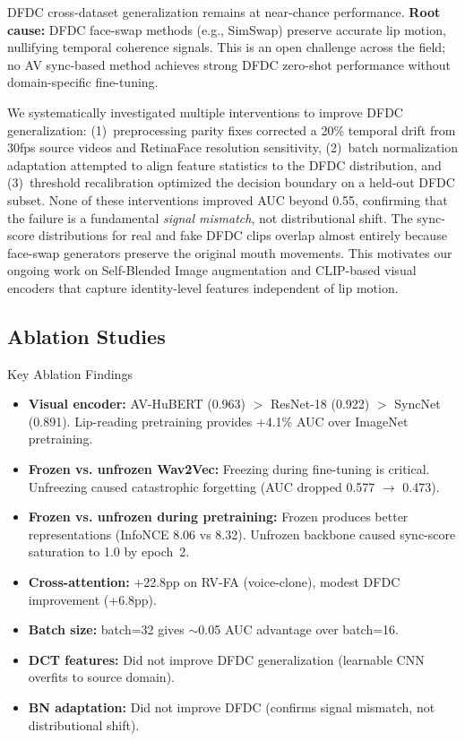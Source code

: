 \documentclass[12pt, letterpaper]{article}
\begin{document}
DFDC cross-dataset generalization remains at near-chance performance. \textbf{Root cause:} DFDC face-swap methods (e.g., SimSwap) preserve accurate lip motion, nullifying temporal coherence signals. This is an open challenge across the field; no AV sync-based method achieves strong DFDC zero-shot performance without domain-specific fine-tuning.

We systematically investigated multiple interventions to improve DFDC generalization: (1)~preprocessing parity fixes corrected a 20\% temporal drift from 30fps source videos and RetinaFace resolution sensitivity, (2)~batch normalization adaptation attempted to align feature statistics to the DFDC distribution, and (3)~threshold recalibration optimized the decision boundary on a held-out DFDC subset. None of these interventions improved AUC beyond 0.55, confirming that the failure is a fundamental \textit{signal mismatch}, not distributional shift. The sync-score distributions for real and fake DFDC clips overlap almost entirely because face-swap generators preserve the original mouth movements. This motivates our ongoing work on Self-Blended Image augmentation and CLIP-based visual encoders that capture identity-level features independent of lip motion.

\subsection{Ablation Studies}

\begin{infobox}{Key Ablation Findings}
\begin{itemize}[leftmargin=1.5em, topsep=0pt]
    \item \textbf{Visual encoder:} AV-HuBERT (0.963) $>$ ResNet-18 (0.922) $>$ SyncNet (0.891). Lip-reading pretraining provides +4.1\% AUC over ImageNet pretraining.
    \item \textbf{Frozen vs. unfrozen Wav2Vec:} Freezing during fine-tuning is critical. Unfreezing caused catastrophic forgetting (AUC dropped 0.577 $\to$ 0.473).
    \item \textbf{Frozen vs. unfrozen during pretraining:} Frozen produces better representations (InfoNCE 8.06 vs 8.32). Unfrozen backbone caused sync-score saturation to 1.0 by epoch~2.
    \item \textbf{Cross-attention:} +22.8pp on RV-FA (voice-clone), modest DFDC improvement (+6.8pp).
    \item \textbf{Batch size:} batch=32 gives $\sim$0.05 AUC advantage over batch=16.
    \item \textbf{DCT features:} Did not improve DFDC generalization (learnable CNN overfits to source domain).
    \item \textbf{BN adaptation:} Did not improve DFDC (confirms signal mismatch, not distributional shift).
\end{itemize}
\end{infobox}
\end{document}
